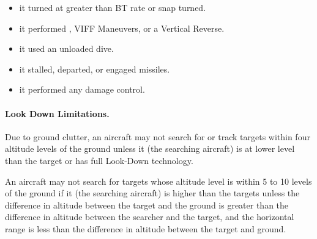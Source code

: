 \begin{itemize}

    \item it turned at greater than BT rate or snap turned.

    \item it performed , VIFF Maneuvers, or a Vertical Reverse.

    \item it used an unloaded dive.


    \item it stalled, departed, or engaged missiles.


    \item it performed any damage control.


\end{itemize}


\paragraph{Look Down Limitations.} Due to ground clutter, an aircraft may not search for or track targets within four altitude levels of the ground unless it (the searching aircraft) is at lower level than the target or has full Look-Down technology.

An aircraft may not search for targets whose altitude level is within 5 to 10 levels of the ground if it (the searching aircraft) is higher than the targets unless the difference in altitude between the target and the ground is greater than the difference in altitude between the searcher and the target, and the horizontal range is less than the difference in altitude between the target and ground.

